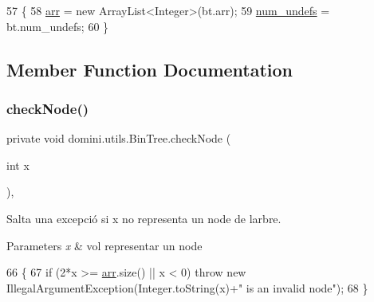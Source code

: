 \begin{DoxyCode}
57                                \{
58         \hyperlink{classdomini_1_1utils_1_1BinTree_a357bcbcf07ba7fcb99d11b237d189e65}{arr} = \textcolor{keyword}{new} ArrayList<Integer>(bt.arr);
59         \hyperlink{classdomini_1_1utils_1_1BinTree_a36f1212262c353accbc0a0385fa45a8d}{num\_undefs} = bt.num\_undefs;
60     \}
\end{DoxyCode}


\subsection{Member Function Documentation}
\mbox{\label{classdomini_1_1utils_1_1BinTree_a32b3e2ad7dfee3425e0b1f6f8b5100f5}} 
\subsubsection{\texorpdfstring{check\+Node()}{checkNode()}}
{\footnotesize\ttfamily private void domini.\+utils.\+Bin\+Tree.\+check\+Node (\begin{DoxyParamCaption}\item[{int}]{x }\end{DoxyParamCaption})\hspace{0.3cm}{\ttfamily [inline]}, {\ttfamily [private]}}



Salta una excepció si x no representa un node de l\textquotesingle{}arbre. 


\begin{DoxyParams}{Parameters}
{\em x} & vol representar un node \\
\hline
\end{DoxyParams}

\begin{DoxyCode}
66                                   \{
67         \textcolor{keywordflow}{if} (2*x >= \hyperlink{classdomini_1_1utils_1_1BinTree_a357bcbcf07ba7fcb99d11b237d189e65}{arr}.size() || x < 0) \textcolor{keywordflow}{throw} \textcolor{keyword}{new} IllegalArgumentException(Integer.toString(x)+\textcolor{stringliteral}{" is an
       invalid node"});
68     \}
\end{DoxyCode}
\mbox{\label{classdomini_1_1utils_1_1BinTree_aee1ed36b9433869f94a6ee8a6815d872}} 
